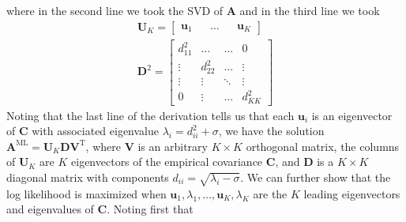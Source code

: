\documentclass[a4paper]{article}
\begin{document}
where in the second line we took the SVD of $\mathbf{A}$ and in the third line we took
\begin{gather*}
\mathbf{U}_K = \begin{bmatrix} \mathbf{u}_1 && \ldots && \mathbf{u}_K \end{bmatrix} \\
\mathbf{D}^2=
\begin{bmatrix}
d_{11}^2 & \ldots & \ldots & 0 \\
\vdots & d_{22}^2 & \ldots & \vdots \\
\vdots & \vdots & \ddots & \vdots \\
0 & \vdots & \ldots & d_{KK}^2
\end{bmatrix}
\end{gather*}
Noting that the last line of the derivation tells us that each $\mathbf{u}_i$ is an eigenvector of $\mathbf{C}$ with associated eigenvalue $\lambda_i = d_{ii}^2 + \sigma$, we have the solution $\mathbf{A}^\textrm{ML} = \mathbf{U}_K \mathbf{DV}^\textrm{T}$, where $\mathbf{V}$ is an arbitrary $K \times K$ orthogonal matrix, the columns of $\mathbf{U}_K$ are $K$ eigenvectors of the empirical covariance $\mathbf{C}$, and $\mathbf{D}$ is a $K\times K$ diagonal matrix with components $d_{ii} = \sqrt{\lambda_i - \sigma}$. We can further show that the log likelihood is maximized when $\mathbf{u}_1,\lambda_1,\ldots,\mathbf{u}_K,\lambda_K$ are the $K$ leading eigenvectors and eigenvalues of $\mathbf{C}$. Noting first that
\end{document}
